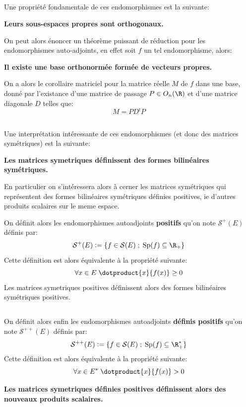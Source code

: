 \subsection*{}
Une propriété fondamentale de ces endomorphismes est la suivante:
\begin{center}
   \textbf{Leurs sous-espaces propres sont orthogonaux.}
\end{center}
On peut alors énoncer un théorème puissant de réduction pour les endomorphismes auto-adjoints, en effet soit \(f\) un tel endomorphisme, alors:
\begin{center}
   \textbf{Il existe une base orthonormée formée de vecteurs propres.}
\end{center}
On a alors le corollaire matriciel pour la matrice réelle \(M\) de \(f\) dans une base, donné par l'existance d'une matrice de passage \(P \in O_n(\R)\) et d'une matrice diagonale \(D\) telles que:
\[
   M = PD{}^tP
\]

\pagebreak
\subsection*{}
Une interprétation intéressante de ces endomorphismes (et donc des matrices symétriques) est la suivante:
\begin{center}
   \textbf{Les matrices symetriques définissent des formes bilinéaires symétriques.}
\end{center}
En particulier on s'intéressera alors à cerner les matrices symétriques qui représentent des formes bilinéaires symétriques définies positives, ie d'autres produits scalaires sur le meme espace.\<

On définit alors les endomorphismes autoadjoints \textbf{positifs} qu'on note \(\mathcal{S}^+(E)\) définis par:
\[
   \mathcal{S}^+(E) := \{ f \in \mathcal{S}(E) \; ; \; \text{Sp}(f) \subseteq \R_+ \}  
\]
Cette définition est alors équivalente à la propriété suivante:
\[
   \forall x \in E \; \dotproduct{x}{f(x)} \geq 0
\]
Les matrices symetriques positives définissent alors des formes bilinéaires symétriques positives.

\subsection*{}
On définit alors enfin les endomorphismes autoadjoints \textbf{définis positifs} qu'on note \(\mathcal{S}^{++}(E)\) définis par:
\[
   \mathcal{S}^{++}(E) := \{ f \in \mathcal{S}(E) \; ; \; \text{Sp}(f) \subseteq \R_+^* \}  
\]
Cette définition est alors équivalente à la propriété suivante:
\[
   \forall x \in E^* \; \dotproduct{x}{f(x)} > 0 
\]
\begin{center}
   \textbf{Les matrices symetriques définies positives définissent alors des nouveaux produits scalaires.}
\end{center}
